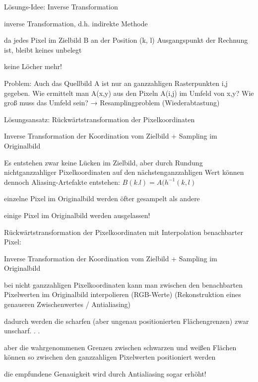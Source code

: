 \documentclass[landscape]{article}
\begin{document}
\begin{multicols}{3}
  Lösungs-Idee: Inverse Transformation
  \begin{itemize*}
    \item inverse Transformation, d.h. indirekte Methode
    \item da jedes Pixel im Zielbild B an der Position (k, l) Ausgangspunkt der Rechnung ist, bleibt keines unbelegt
    \item keine Löcher mehr!
    \item Problem: Auch das Quellbild A ist nur an ganzzahligen Rasterpunkten i,j gegeben. Wie ermittelt man A(x,y) aus den Pixeln A(i,j) im Umfeld von x,y? Wie groß muss das Umfeld sein? → Resamplingproblem (Wiederabtastung)
  \end{itemize*}
  
  Lösungsansatz: Rückwärtstransformation der Pixelkoordinaten
  \begin{itemize*}
    \item Inverse Transformation der Koordination vom Zielbild + Sampling im Originalbild
    \item Es entstehen zwar keine Lücken im Zielbild, aber durch Rundung nichtganzzahliger Pixelkoordinaten auf den nächstenganzzahligen Wert können dennoch Aliasing-Artefakte entstehen: $B(k.l)=A(h^{-1}(k,l)$
    \begin{itemize*}
      \item einzelne Pixel im Originalbild werden öfter gesampelt als andere
      \item einige Pixel im Originalbild werden ausgelassen!
    \end{itemize*}
  \end{itemize*}
  
  
  Rückwärtstransformation der Pixelkoordinaten mit Interpolation benachbarter Pixel:
  \begin{itemize*}
    \item Inverse Transformation der Koordination vom Zielbild + Sampling im Originalbild
    \item bei nicht ganzzahligen Pixelkoordinaten kann man zwischen den benachbarten Pixelwerten im Originalbild interpolieren (RGB-Werte) (Rekonstruktion eines genaueren Zwischenwertes / Antialiasing)
    \item dadurch werden die scharfen (aber ungenau positionierten Flächengrenzen) zwar unscharf. . .
    \item aber die wahrgenommenen Grenzen zwischen schwarzen und weißen Flächen können so zwischen den ganzzahligen Pixelwerten positioniert werden
    \item die empfundene Genauigkeit wird durch Antialiasing sogar erhöht!
  \end{itemize*}
  

\end{multicols}
\end{document}

